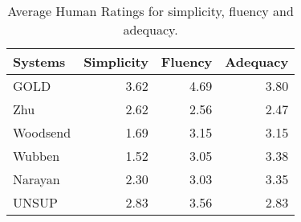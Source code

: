 \documentclass[11pt,a4paper]{article}
\begin{document}
\begin{table}[htbp]
  \begin{center}
    \begin{footnotesize}
      \vspace{-0.2cm}
      \begin{tabular}{|l|r|r|r|}\hline
        Systems & Simplicity & Fluency & Adequacy \\ \hline
        GOLD & 3.62 & 4.69 & 3.80\\
        Zhu & 2.62 & 2.56 &  2.47 \\
        Woodsend & 1.69 & 3.15 & 3.15 \\
        Wubben & 1.52 & 3.05 & 3.38 \\
        Narayan & 2.30 & 3.03 & 3.35 \\ \hline
        UNSUP & 2.83 & 3.56 & 2.83\\ \hline
      \end{tabular}
      \caption{\small Average Human Ratings for simplicity, fluency
        and adequacy.}\label{tab:humaneval}
      \vspace{-0.3cm}
    \end{footnotesize}
  \end{center}
\end{table}
\end{document}
